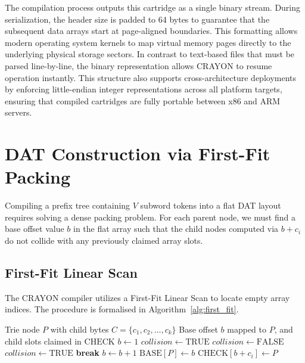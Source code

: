 \documentclass[10pt,journal,compsoc]{IEEEtran}
\begin{document}
The compilation process outputs this cartridge as a single binary stream. During serialization, the header size is padded to 64 bytes to guarantee that the subsequent data arrays start at page-aligned boundaries. This formatting allows modern operating system kernels to map virtual memory pages directly to the underlying physical storage sectors. In contrast to text-based files that must be parsed line-by-line, the binary representation allows CRAYON to resume operation instantly. This structure also supports cross-architecture deployments by enforcing little-endian integer representations across all platform targets, ensuring that compiled cartridges are fully portable between x86 and ARM servers.

\section{DAT Construction via First-Fit Packing}
Compiling a prefix tree containing $V$ subword tokens into a flat DAT layout requires solving a dense packing problem. For each parent node, we must find a base offset value $b$ in the flat array such that the child nodes computed via $b + c_i$ do not collide with any previously claimed array slots.

\subsection{First-Fit Linear Scan}
The CRAYON compiler utilizes a First-Fit Linear Scan to locate empty array indices. The procedure is formalised in Algorithm~\ref{alg:first_fit}.

\begin{algorithm}[H]
\caption{First-Fit DAT Array Packing}
\label{alg:first_fit}
\begin{algorithmic}[1]
\REQUIRE Trie node $P$ with child bytes $C = \{c_1, c_2, \dots, c_k\}$
\ENSURE Base offset $b$ mapped to $P$, and child slots claimed in $\text{CHECK}$
\STATE $b \leftarrow 1$
\STATE $collision \leftarrow \text{TRUE}$
    \STATE $collision \leftarrow \text{FALSE}$
            \STATE $collision \leftarrow \text{TRUE}$
            \STATE \textbf{break}
        \ENDIF
    \ENDFOR
        \STATE $b \leftarrow b + 1$
    \ENDIF
\ENDWHILE
\STATE $\text{BASE}[P] \leftarrow b$
    \STATE $\text{CHECK}[b + c_i] \leftarrow P$
\ENDFOR
\end{algorithmic}
\end{algorithm}
\end{document}
